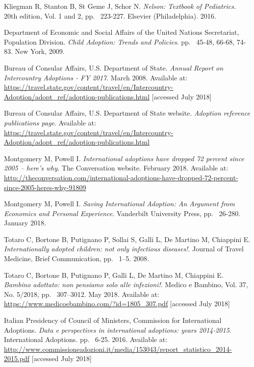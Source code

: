 
\begin{thebibliography}{50}

  Kliegman R, Stanton B, St Geme J, Schor N.
  \textit{Nelson: Textbook of Pediatrics}.
  20th edition, Vol. 1 and 2,
  pp. ~223-227.
  Elsevier (Philadelphia).
  2016.
  
  Department of Economic and Social Affairs of the United Nations Secretariat, Population Division.
  \textit{Child Adoption: Trends and Policies}.
  pp. ~45-48, 66-68, 74-83.
  New York,
  2009.

  Bureau of Consular Affairs, U.S. Department of State.
  \textit{Annual Report on Intercountry Adoptions - FY 2017}.
  March 2008.
  Available at: \url{https://travel.state.gov/content/travel/en/Intercountry-Adoption/adopt_ref/adoption-publications.html} [accessed July 2018]
  
  Bureau of Consular Affairs, U.S. Department of State website.
  \textit{Adoption reference publications page}.
  Available at: \url{https://travel.state.gov/content/travel/en/Intercountry-Adoption/adopt_ref/adoption-publications.html}

  Montgomery M, Powell I.
  \textit{International adoptions have dropped 72 percent since 2005 – here’s why}.
  The Conversation website.
  February 2018.
  Available at: \url{http://theconversation.com/international-adoptions-have-dropped-72-percent-since-2005-heres-why-91809}
  
  Montgomery M, Powell I.
  \textit{Saving International Adoption: An Argument from Economics and Personal Experience}.
  Vanderbilt University Press,
  pp. ~26-280.
  January 2018.
  
  Totaro C, Bortone B, Putignano P, Sollai S, Galli L, De Martino M, Chiappini E.
  \textit{Internationally adopted children: not only infectious diseases!}.
  Journal of Travel Medicine,
  Brief Communication,
  pp. ~1–5.
  2008.
  
  Totaro C, Bortone B, Putignano P, Galli L, De Martino M, Chiappini E.
  \textit{Bambino adottato: non pensiamo solo alle infezioni!}.
  Medico e Bambino, Vol. 37, No. 5/2018,
  pp. ~307–3012.
  May 2018.
  Available at: \url{https://www.medicoebambino.com/?id=1805_307.pdf} [accessed July 2018]
  
  Italian Presidency of Council of Ministers, Commission for International Adoptions.
  \textit{Data e perspectives in international adoptions: years 2014-2015}.
  International Adoptions.
  pp. ~6-25.
  2016.
  Available at: \url{http://www.commissioneadozioni.it/media/153043/report_statistico_2014-2015.pdf} [accessed July 2018]  
  

\end{thebibliography}
